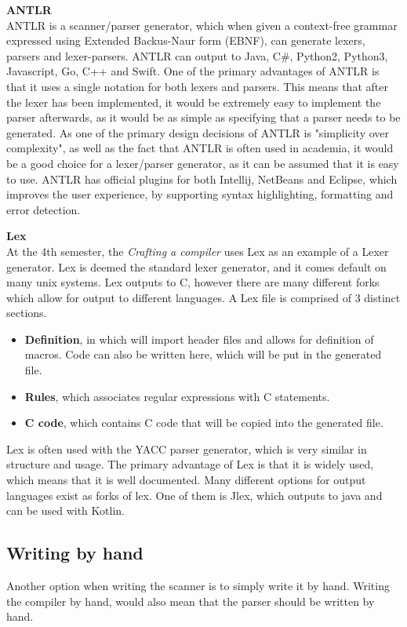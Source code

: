 \textbf{ANTLR}\\
ANTLR is a scanner/parser generator, which when given a context-free grammar expressed using Extended Backus-Naur form (EBNF), can generate lexers, parsers and lexer-parsers\cite{ANTLR}.
ANTLR can output to Java, C\#, Python2, Python3, Javascript, Go, C++ and Swift\cite{ANTLRDocsTargets}.
One of the primary advantages of ANTLR is that it uses a single notation for both lexers and parsers\cite{ANTLRDocs}.
This means that after the lexer has been implemented, it would be extremely easy to implement the parser afterwards, as it would be as simple as specifying that a parser needs to be generated.
As one of the primary design decisions of ANTLR is "simplicity over complexity", as well as the fact that ANTLR is often used in academia, it would be a good choice for a lexer/parser generator, as it can be assumed that it is easy to use.
ANTLR has official plugins for both Intellij, NetBeans and Eclipse, which improves the user experience, by supporting syntax highlighting, formatting and error detection.

\textbf{Lex}\\
At the 4th semester, the \textit{Crafting a compiler} uses Lex as an example of a Lexer generator\cite{CraftingACompiler}.
Lex is deemed the standard lexer generator, and it comes default on many unix systems.
Lex outputs to C, however there are many different forks which allow for output to different languages.
A Lex file is comprised of 3 distinct sections\cite{Lex}.
\begin{itemize}
	\item \textbf{Definition}, in which will import header files and allows for definition of macros. 
	Code can also be written here, which will be put in the generated file.
	\item \textbf{Rules}, which associates regular expressions with C statements.
	\item \textbf{C code}, which contains C code that will be copied into the generated file.
\end{itemize}
Lex is often used with the YACC parser generator, which is very similar in structure and usage.
The primary advantage of Lex is that it is widely used, which means that it is well documented.
Many different options for output languages exist as forks of lex.
One of them is Jlex\cite{JLex}, which outputs to java and can be used with Kotlin.

\subsection{Writing by hand}
Another option when writing the scanner is to simply write it by hand.
Writing the compiler by hand, would also mean that the parser should be written by hand.

